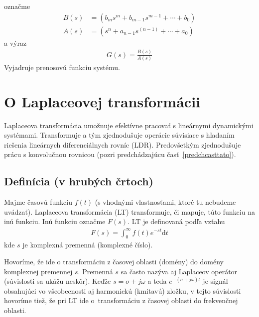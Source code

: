 \documentclass[a4paper, 10pt, ]{article}
\begin{document}
označme
\begin{subequations}
	\begin{align}
		B(s) &= \left( b_m   s^m + b_{m-1}   s^{m-1} + \cdots + b_0 \right) \\
		A(s) &=  \left( s^n + a_{n-1}   s^{(n-1)} + \cdots + a_0 \right)
	\end{align}
\end{subequations}
a výraz
\begin{align}
	G(s) = \frac{B(s)}{A(s)}
\end{align}
Vyjadruje prenosovú funkciu systému.

























\section{O Laplaceovej transformácii}

Laplaceova transformácia umožnuje efektívne pracovať s lineárnymi dynamickými systémami. Transformuje a tým zjednodušuje operácie súvisiace s hľadaním riešenia lineárnych diferenciálnych rovníc (LDR). Predovšetkým zjednodušuje prácu s konvolučnou rovnicou (pozri predchádzajúcu časť~\ref{predchcasttato}).

\subsection{Definícia (v hrubých črtoch)}

Majme časovú funkciu $f(t)$ (s vhodnými vlastnosťami, ktoré tu nebudeme uvádzať). Laplaceova transformácia (LT) transformuje, či mapuje, túto funkciu na inú funkciu. Inú funkciu označme $F(s)$. LT je definovaná podľa vzťahu
\begin{align}
    F(s) = \int_0^\infty f(t) e^{-st}\text{d}t
\end{align}
kde $s$ je komplexná premenná (komplexné číslo).

Hovoríme, že ide o transformáciu z časovej oblasti (domény) do domény komplexnej premennej $s$. Premenná $s$ sa často nazýva aj Laplaceov operátor (súvislosti sa ukážu neskôr). Keďže $s = \sigma + j\omega$ a teda $e^{-(\sigma + j\omega)t}$ je signál obsahujúci vo všeobecnosti aj harmonickú (kmitavú) zložku, v tejto súvislosti hovoríme tiež, že pri LT ide o~transformáciu z časovej oblasti do frekvenčnej oblasti.
\end{document}
